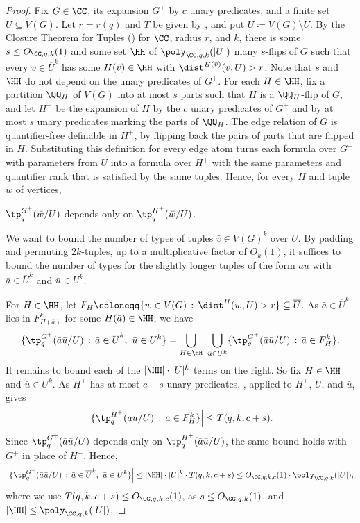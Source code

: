 \begin{proof}
    Fix $G\in\CC$, its expansion $G^+$ by $c$ unary predicates, and a finite set $U\subseteq V(G)$.
    Let $r=r(q)$ and $T$ be given by , and put $\overline{U}\coloneqq V(G)\setminus U$.
    By the Closure Theorem for Tuples () for $\CC$, radius $r$, and $k$, there is some $s\leq O_{\CC,q,k}(1)$ and some set $\HH$ of $\poly_{\CC,q,k}(|U|)$ many $s$-flips of $G$ such that every $\bar v\in\overline{U}^k$ has some $H(\bar v)\in\HH$ with $\dist^{H(\bar v)}(\bar v,U)>r$.
    Note that $s$ and $\HH$ do not depend on the unary predicates of $G^+$.
    For each $H\in\HH$, fix a partition $\QQ_H$ of $V(G)$ into at most $s$ parts such that $H$ is a $\QQ_H$-flip of $G$, and let $H^+$ be the expansion of $H$ by the $c$ unary predicates of $G^+$ and by at most $s$ unary predicates marking the parts of $\QQ_H$.
    The edge relation of $G$ is quantifier-free definable in $H^+$, by flipping back the pairs of parts that are flipped in $H$.
    Substituting this definition for every edge atom turns each formula over $G^+$ with parameters from $U$ into a formula over $H^+$ with the same parameters and quantifier rank that is satisfied by the same tuples.
    Hence, for every $H$ and tuple $\bar w$ of vertices,
    \begin{center}
        $\tp_q^{G^+}(\bar w/U)$ depends only on $\tp_q^{H^+}(\bar w/U)$.
    \end{center}

    We want to bound the number of types of tuples $\bar v \in V(G)^k$ over $U$.
    By padding and permuting $2k$-tuples, up to a multiplicative factor of $O_k(1)$, it suffices to bound the number of types for the slightly longer tuples of the form $\bar a\bar u$ with $\bar a \in \overline{U}^k$ and $\bar u \in U^k$.

    For $H\in\HH$, let $F_H\coloneqq\{w\in V(G) \,:\, \dist^H(w,U)>r\} \subseteq \overline{U}$.
    As $\bar a\in\overline{U}^k$ lies in $F_{H(\bar a)}^k$ for some $H(\bar a) \in \HH$, we have
    \[
        \{\tp_q^{G^+}(\bar a\bar u/U) \,:\, \bar a\in\overline{U}^k,\ \bar u\in U^k\}
        =
        \bigcup_{H\in\HH}\ \bigcup_{\bar u\in U^k}
        \{\tp_q^{G^+}(\bar a\bar u/U) \,:\, \bar a\in F_H^k\}.
    \]
    It remains to bound each of the $|\HH|\cdot|U|^k$ terms on the right.
    So fix $H\in\HH$ and $\bar u\in U^k$.
    As $H^+$ has at most $c+s$ unary predicates, , applied to $H^+$, $U$, and $\bar u$, gives
    \[
        \left|\{\tp_q^{H^+}(\bar a\bar u/U) \,:\, \bar a\in F_H^k\}\right|
        \leq T(q,k,c+s).
    \]
    Since $\tp_q^{G^+}(\bar a\bar u/U)$ depends only on $\tp_q^{H^+}(\bar a\bar u/U)$, the same bound holds with $G^+$ in place of $H^+$.
    Hence,
    \[
        \left|\{\tp_q^{G^+}(\bar a\bar u/U) \,:\, \bar a\in\overline{U}^k,\ \bar u\in U^k\}\right|
        \leq|\HH|\cdot|U|^k\cdot T(q,k,c+s)
        \leq O_{\CC,q,k,c}(1)\cdot\poly_{\CC,q,k}(|U|),
    \]
    where we use $T(q,k,c+s)\leq O_{\CC,q,k,c}(1)$, as $s\leq O_{\CC,q,k}(1)$, and $|\HH|\leq\poly_{\CC,q,k}(|U|)$.
\end{proof}
